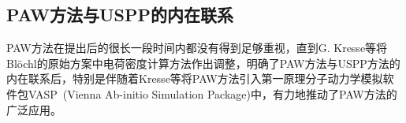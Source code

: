 
\subsection{\rm{PAW}方法与\rm{USPP}的内在联系}
%
\textrm{PAW}方法在提出后的很长一段时间内都没有得到足够重视，直到\textrm{G. Kresse}等将\textrm{Bl\"ochl}的原始方案中电荷密度计算方法作出调整，明确了\textrm{PAW}方法与\textrm{USPP}方法的内在联系后，特别是伴随着\textrm{Kresse}等将\textrm{PAW}方法引入第一原理分子动力学模拟软件包\textrm{VASP~(Vienna Ab-initio Simulation Package)}中，有力地推动了\textrm{PAW}方法的广泛应用。

